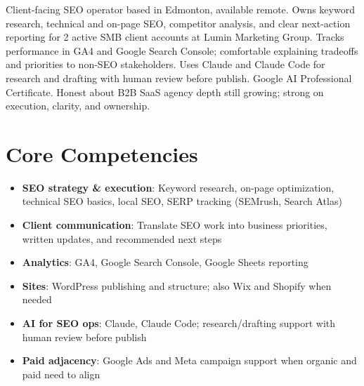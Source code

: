 \documentclass[11pt,a4paper,sans]{moderncv}
\begin{document}
\makecvtitle

\vspace{6pt}
\small{Client-facing SEO operator based in Edmonton, available remote. Owns keyword research, technical and on-page SEO, competitor analysis, and clear next-action reporting for 2 active SMB client accounts at Lumin Marketing Group. Tracks performance in GA4 and Google Search Console; comfortable explaining tradeoffs and priorities to non-SEO stakeholders. Uses Claude and Claude Code for research and drafting with human review before publish. Google AI Professional Certificate. Honest about B2B SaaS agency depth still growing; strong on execution, clarity, and ownership.}

\section{Core Competencies}
\vspace{1pt}
\begin{itemize}
\item \textbf{SEO strategy \& execution}: Keyword research, on-page optimization, technical SEO basics, local SEO, SERP tracking (SEMrush, Search Atlas)
\item \textbf{Client communication}: Translate SEO work into business priorities, written updates, and recommended next steps
\item \textbf{Analytics}: GA4, Google Search Console, Google Sheets reporting
\item \textbf{Sites}: WordPress publishing and structure; also Wix and Shopify when needed
\item \textbf{AI for SEO ops}: Claude, Claude Code; research/drafting support with human review before publish
\item \textbf{Paid adjacency}: Google Ads and Meta campaign support when organic and paid need to align
\end{itemize}
\end{document}
